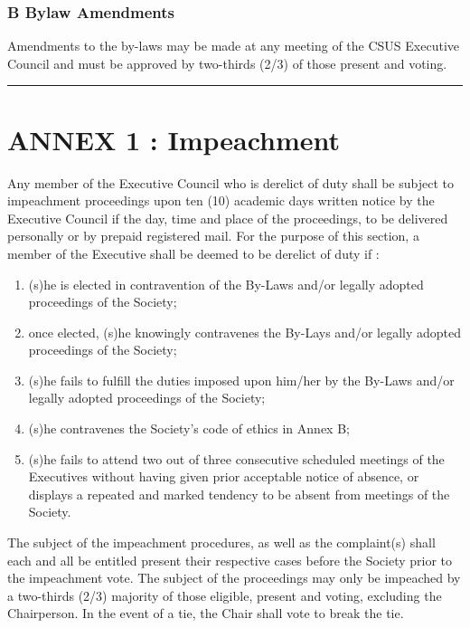 \section{B Bylaw Amendments}\label{b-bylaw-amendments}

Amendments to the by-laws may be made at any meeting of the CSUS
Executive Council and must be approved by two-thirds (2/3) of those
present and voting.

\begin{center}\rule{0.5\linewidth}{\linethickness}\end{center}

\part{ANNEX 1 : Impeachment}\label{annex-1-impeachment}

Any member of the Executive Council who is derelict of duty shall be
subject to impeachment proceedings upon ten (10) academic days written
notice by the Executive Council if the day, time and place of the
proceedings, to be delivered personally or by prepaid registered mail.
For the purpose of this section, a member of the Executive shall be
deemed to be derelict of duty if :

\begin{enumerate}
\def\labelenumi{\alph{enumi})}
\item
  (s)he is elected in contravention of the By-Laws and/or legally
  adopted proceedings of the Society;
\item
  once elected, (s)he knowingly contravenes the By-Lays and/or legally
  adopted proceedings of the Society;
\item
  (s)he fails to fulfill the duties imposed upon him/her by the By-Laws
  and/or legally adopted proceedings of the Society;
\item
  (s)he contravenes the Society's code of ethics in Annex B;
\item
  (s)he fails to attend two out of three consecutive scheduled meetings
  of the Executives without having given prior acceptable notice of
  absence, or displays a repeated and marked tendency to be absent from
  meetings of the Society.
\end{enumerate}

The subject of the impeachment procedures, as well as the complaint(s)
shall each and all be entitled present their respective cases before the
Society prior to the impeachment vote. The subject of the proceedings
may only be impeached by a two-thirds (2/3) majority of those eligible,
present and voting, excluding the Chairperson. In the event of a tie,
the Chair shall vote to break the tie.


